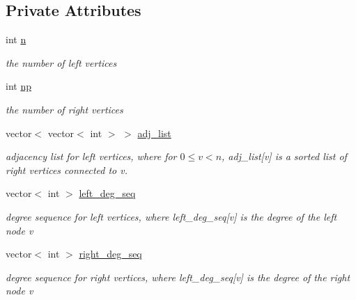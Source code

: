 \subsection*{Private Attributes}
\begin{DoxyCompactItemize}
\item 
int \hyperlink{classb__graph_a9e211d40c1799bc9b125de472ff06642}{n}
\begin{DoxyCompactList}\small\item\em the number of left vertices \end{DoxyCompactList}\item 
int \hyperlink{classb__graph_acffdd5f20329515eb6ec17ad24f1ca64}{np}
\begin{DoxyCompactList}\small\item\em the number of right vertices \end{DoxyCompactList}\item 
vector$<$ vector$<$ int $>$ $>$ \hyperlink{classb__graph_a2a89d2e8f958270952aab2e8769b7342}{adj\+\_\+list}
\begin{DoxyCompactList}\small\item\em adjacency list for left vertices, where for $0 \leq v < n $, adj\+\_\+list\mbox{[}v\mbox{]} is a sorted list of right vertices connected to v. \end{DoxyCompactList}\item 
vector$<$ int $>$ \hyperlink{classb__graph_a311d16462dbb10c47b3a6c80a42139d9}{left\+\_\+deg\+\_\+seq}
\begin{DoxyCompactList}\small\item\em degree sequence for left vertices, where left\+\_\+deg\+\_\+seq\mbox{[}v\mbox{]} is the degree of the left node v \end{DoxyCompactList}\item 
vector$<$ int $>$ \hyperlink{classb__graph_ae4c875ed6a583a78f38dfe958f20fad5}{right\+\_\+deg\+\_\+seq}
\begin{DoxyCompactList}\small\item\em degree sequence for right vertices, where left\+\_\+deg\+\_\+seq\mbox{[}v\mbox{]} is the degree of the right node v \end{DoxyCompactList}\end{DoxyCompactItemize}
